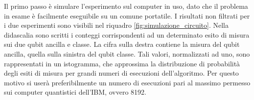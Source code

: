 Il primo passo è simulare l'esperimento sul computer in uso, dato che il problema in esame
è facilmente eseguibile su un comune portatile. I risultati non filtrati per i due esperimenti 
sono visibili nel riquadro \ref{fig:simulazione_circuito}. Nella didascalia sono scritti i conteggi corrispondenti ad un 
determinato esito di misura sui due qubit ancilla e classe. La cifra sulla destra contiene la 
misura del qubit ancilla, quella sulla sinistra del qubit classe. Tali valori, normalizzati ad uno, 
sono rappresentati in un istogramma, che approssima la distribuzione di probabilità degli esiti di 
misura per grandi numeri di esecuzioni dell'algoritmo. Per questo motivo si userà preferibilmente 
un numero di esecuzioni pari al massimo permesso sui computer quantistici dell'IBM, ovvero 8192. 
\begin{figure}[h!]
    \myfloatalign
     \\
\end{figure}
